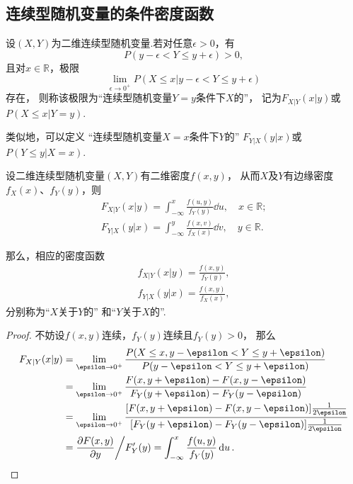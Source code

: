 \subsection{连续型随机变量的条件密度函数}
\begin{definition}
设\((X,Y)\)为二维连续型随机变量.若对任意\(\epsilon > 0\)，有\[
P(y - \epsilon < Y \leq y + \epsilon) > 0,
\]且对\(x\in\mathbb{R}\)，极限\[
\lim_{\epsilon\to0^+} P(X \leq x \vert y - \epsilon < Y \leq y + \epsilon)
\]存在，
则称该极限为“连续型随机变量\(Y=y\)条件下\(X\)的”，
记为\(F_{X \vert Y}(x \vert y)\)或\(P(X \leq x \vert Y = y)\).

类似地，可以定义%
“连续型随机变量\(X=x\)条件下\(Y\)的”%
\(F_{Y \vert X}(y \vert x)\)或\(P(Y \leq y \vert X = x)\).
\end{definition}

\begin{theorem}
设二维连续型随机变量\((X,Y)\)有二维密度\(f(x,y)\)，
从而\(X\)及\(Y\)有边缘密度\(f_X(x)\)、\(f_Y(y)\)，则
\begin{align*}
F_{X \vert Y}(x \vert y) = \int_{-\infty}^{x} \frac{f(u,y)}{f_Y(y)}\dd{u}, \quad x \in \mathbb{R}; \\
F_{Y \vert X}(y \vert x) = \int_{-\infty}^{y} \frac{f(x,v)}{f_X(x)}\dd{v}, \quad y \in \mathbb{R}.
\end{align*}

那么，相应的密度函数
\begin{gather}
f_{X \vert Y}(x \vert y) = \frac{f(x,y)}{f_Y(y)}, \label{equation:多维随机变量及其分布.条件密度、联合密度、边缘密度的关系1} \\
f_{Y \vert X}(y \vert x) = \frac{f(x,y)}{f_X(x)}, \label{equation:多维随机变量及其分布.条件密度、联合密度、边缘密度的关系2}
\end{gather}
分别称为“\(X\)关于\(Y\)的”%
和“\(Y\)关于\(X\)的”.
\begin{proof}
不妨设\(f(x,y)\)连续，\(f_Y(y)\)连续且\(f_Y(y)>0\)，
\def\l{\lim_{\epsilon\to0^+}}%
那么\begin{align*}
F_{X \vert Y}(x \vert y)
&= \l \frac{P(X \leq x, y - \epsilon < Y \leq y + \epsilon)}{P(y - \epsilon < Y \leq y + \epsilon)} \\
&= \l \frac{F(x,y+\epsilon) - F(x,y-\epsilon)}{F_Y(y+\epsilon) - F_Y(y-\epsilon)} \\
&= \l \frac{[F(x,y+\epsilon) - F(x,y-\epsilon)] \frac{1}{2 \epsilon}}{[F_Y(y+\epsilon) - F_Y(y-\epsilon)] \frac{1}{2 \epsilon}} \\
&= \pdv{F(x,y)}{y} \bigg/ F_Y'(y)
= \int_{-\infty}^x \frac{f(u,y)}{f_Y(y)} \dd{u}.
\qedhere
\end{align*}
\end{proof}
\end{theorem}


